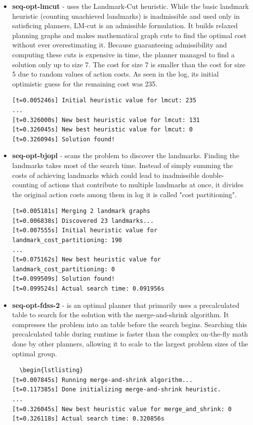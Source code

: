 \documentclass{article}
\begin{document}
\begin{itemize}
  \item \textbf{seq-opt-lmcut} - uses the Landmark-Cut heuristic. While the basic landmark heuristic (counting unachieved landmarks) is inadmissible and used only in satisficing planners, LM-cut is an admissible formulation. It builds relaxed planning graphs and makes mathematical graph cuts to find the optimal cost without ever overestimating it. Because guaranteeing admissibility and computing these cuts is expensive in time, the planner managed to find a solution only up to size 7. The cost for size 7 is smaller than the cost for size 5 due to random values of action costs. As seen in the log, its initial optimistic guess for the remaining cost was 235.
   \begin{lstlisting}
[t=0.005246s] Initial heuristic value for lmcut: 235
...
[t=0.326000s] New best heuristic value for lmcut: 131
[t=0.326045s] New best heuristic value for lmcut: 0
[t=0.326094s] Solution found!
  \end{lstlisting}

  \item \textbf{seq-opt-bjopl} - scans the problem to discover the landmarks. Finding the landmarks takes most of the search time. Instead of simply summing the costs of achieving landmarks which could lead to inadmissible double-counting of actions that contribute to multiple landmarks at once, it divides the original action costs among them in log it is called "cost partitioning".
 \begin{lstlisting}
[t=0.005181s] Merging 2 landmark graphs
[t=0.006838s] Discovered 23 landmarks...
[t=0.007555s] Initial heuristic value for landmark_cost_partitioning: 190
...
[t=0.075162s] New best heuristic value for landmark_cost_partitioning: 0
[t=0.099509s] Solution found!
[t=0.099524s] Actual search time: 0.091956s
  \end{lstlisting}
  \item \textbf{seq-opt-fdss-2} - is an optimal planner that primarily uses a precalculated table to search for the solution with the merge-and-shrink algorithm. It compresses the problem into an table before the search begins. Searching this precalculated table during runtime is faster than the complex on-the-fly math done by other planners, allowing it to scale to the largest problem sizes of the optimal group.
  \begin{lstlisting}
  \begin{lstlisting}
[t=0.007845s] Running merge-and-shrink algorithm...
[t=0.117385s] Done initializing merge-and-shrink heuristic.
...
[t=0.326045s] New best heuristic value for merge_and_shrink: 0
[t=0.326118s] Actual search time: 0.320856s
  \end{lstlisting}
\end{itemize}
\end{document}
